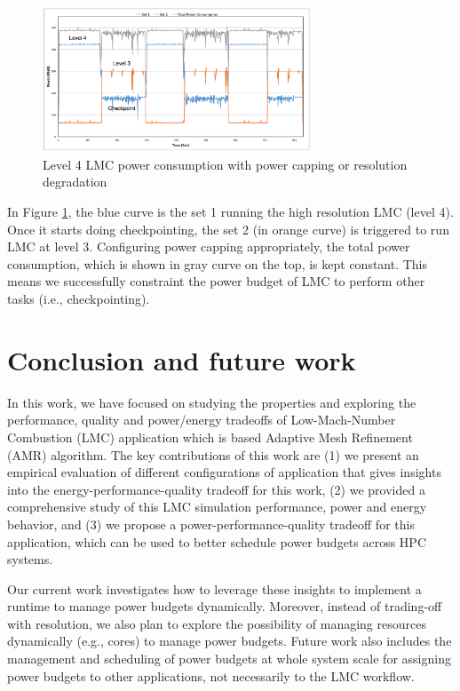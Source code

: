 \documentclass[10pt, conference, compsocconf]{IEEEtran}
\begin{document}
\begin{figure}[H]
	\centering
    \includegraphics[width=8cm]{figs/LMCtradeoff.png}
        \caption{Level 4 LMC power consumption with power capping or resolution degradation}
        \label{fig:LMCtradeoff}
\end{figure}

In Figure \ref{fig:LMCtradeoff}, the blue curve is the set 1 running the high resolution LMC (level 4). Once it starts doing checkpointing, the set 2 (in orange curve) is triggered to run LMC at level 3. Configuring power capping appropriately, the total power consumption, which is shown in gray curve on the top, is kept constant. This means we successfully constraint the power budget of LMC to perform other tasks (i.e., checkpointing).






\section{Conclusion and future work}
In this work, we  have focused on studying the properties and exploring the performance, quality and power/energy tradeoffs of Low-Mach-Number Combustion (LMC) application which is based Adaptive Mesh Refinement (AMR) algorithm. The key contributions of this work are (1) we present an empirical evaluation of different configurations of application that gives insights into the energy-performance-quality tradeoff for this work, (2) we provided a comprehensive study of this LMC simulation performance, power and energy behavior, and (3) we propose a power-performance-quality tradeoff for this application, which can be used to better schedule power budgets across HPC systems.

Our current work investigates how to leverage these insights to implement a runtime to manage power budgets dynamically. Moreover, instead of trading-off with resolution, we also plan to explore the possibility of managing resources dynamically (e.g., cores) to manage power budgets. Future work also includes the management and scheduling of power budgets at whole system scale for assigning power budgets to other applications, not necessarily to the LMC workflow.
\end{document}
